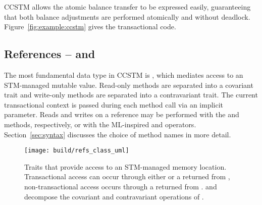 CCSTM allows the atomic balance transfer to be expressed easily,
guaranteeing that both balance adjustments are performed atomically and
without deadlock.  Figure~\ref{fig:example:ccstm} gives the transactional
code.

\subsection{References --  and }

The most fundamental data type in CCSTM is , which mediates
access to an STM-managed mutable value.  Read-only methods are separated into a
covariant  trait and write-only methods are separated into a
contravariant  trait.  The current transactional context is passed
during
each method call via an implicit parameter.  Reads and writes on a
reference may be performed with the  and  methods,
respectively, or with the ML-inspired  and \code{:=}
operators.  Section~\ref{sec:syntax} discusses
the choice of method names in more detail.

\begin{figure*}
  \centering
  \texttt{[image: build/refs\_class\_uml]}

\caption{Traits that provide access to an STM-managed memory
location.  Transactional access can occur through either 
or a  returned from ,
non-transactional access occurs through a  returned
from .   and 
decompose the covariant and contravariant operations of .}

\label{fig:refclasses}
\end{figure*}


